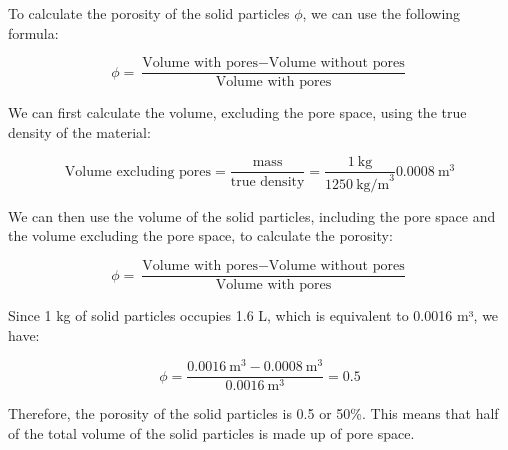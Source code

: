 \documentclass[../Article_Model_Parameters.tex]{subfiles}
\begin{document}
	
	To calculate the porosity of the solid particles $\phi$, we can use the following formula:

    {\footnotesize
        \begin{equation}
            \phi = \dfrac{\text{Volume with pores} - \text{Volume without pores}}{\text{Volume with pores}}
        \end{equation}
    }

    We can first calculate the volume, excluding the pore space, using the true density of the material:

    {\footnotesize
        \begin{equation}
            \text{Volume excluding pores} = \dfrac{\text{mass}}{\text{true density}} = \dfrac{1\ \text{kg}}{1250\ \text{kg/m}^3} 0.0008\ \text{m}^3
        \end{equation}
    }
    
    We can then use the volume of the solid particles, including the pore space and the volume excluding the pore space, to calculate the porosity:

    {\footnotesize
        \begin{equation}
            \phi = \dfrac{\text{Volume with pores} - \text{Volume without pores}}{\text{Volume with pores}}   
        \end{equation}
    }
    
    Since 1 kg of solid particles occupies 1.6 L, which is equivalent to 0.0016 m³, we have:

    {\footnotesize
        \begin{equation}
            \phi = \dfrac{0.0016\ \text{m}^3 - 0.0008\ \text{m}^3}{0.0016\ \text{m}^3} = 0.5
        \end{equation}
    }
    
    Therefore, the porosity of the solid particles is 0.5 or 50\%. This means that half of the total volume of the solid particles is made up of pore space.
	
\end{document}
